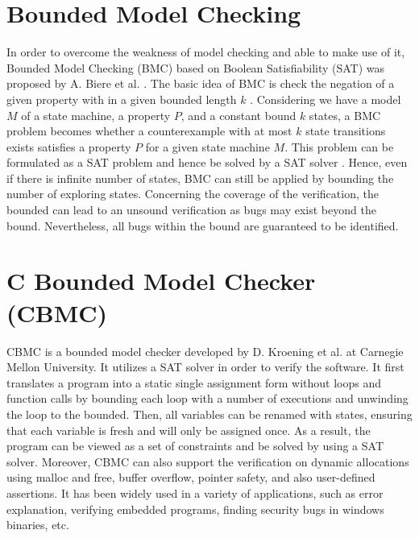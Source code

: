 

\section{Bounded Model Checking} \label{sec:bmc}
In order to overcome the weakness of model checking and able to make use of it, Bounded Model Checking (BMC) based on Boolean Satisfiability (SAT) was proposed by A. Biere et al. \cite{biere2003bounded}. The basic idea of BMC is check the negation of a given property with in a given bounded length $k$ \cite{7371997}. Considering we have a model $M$ of a state machine, a property $P$, and a constant bound $k$ states, a BMC problem becomes whether a counterexample with at most $k$ state transitions exists satisfies a property $P$ for a given state machine $M$. This problem can be formulated as a SAT problem and hence be solved by a SAT solver \cite{1_sagiv_2015}. Hence, even if there is infinite number of states, BMC can still be applied by bounding the number of exploring states. Concerning the coverage of the verification, the bounded can lead to an unsound verification as bugs may exist beyond the bound. Nevertheless, all bugs within the bound are guaranteed to be identified. 

\section{C Bounded Model Checker (CBMC)} \label{sec:cbmc}
CBMC \cite{the_cprover_user_manual} \cite{ckl2004} is a bounded model checker developed by D. Kroening et al. at Carnegie Mellon University. It utilizes a SAT solver in order to verify the software. It first translates a program into a static single assignment form without loops and function calls by bounding each loop with a number of executions and unwinding the loop to the bounded. Then, all variables can be renamed with states, ensuring that each variable is fresh and will only be assigned once. As a result, the program can be viewed as a set of constraints and be solved by using a SAT solver. Moreover, CBMC can also support the verification on dynamic allocations using malloc and free, buffer overflow, pointer safety, and also user-defined assertions. It has been widely used in a variety of applications, such as error explanation, verifying embedded programs, finding security bugs in windows binaries, etc.

